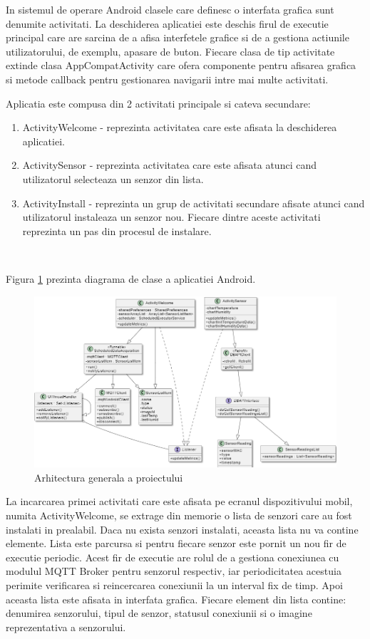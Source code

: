 In sistemul de operare Android clasele care definesc o interfata grafica sunt denumite activitati. La deschiderea aplicatiei este deschis firul de executie principal 
care are sarcina de a afisa interfetele grafice si de a gestiona actiunile utilizatorului, de exemplu, apasare de buton. Fiecare clasa de tip activitate extinde 
clasa AppCompatActivity care ofera componente pentru afisarea grafica si metode callback pentru gestionarea navigarii intre mai multe activitati. 

Aplicatia este compusa din 2 activitati principale si cateva secundare:
\begin{enumerate}
	\item ActivityWelcome - reprezinta activitatea care este afisata la deschiderea aplicatiei.
	\item ActivitySensor - reprezinta activitatea care este afisata atunci cand utilizatorul selecteaza un senzor din lista.
	\item ActivityInstall - reprezinta un grup de activitati secundare afisate atunci cand utilizatorul instaleaza un senzor nou. Fiecare dintre aceste 
	activitati reprezinta un pas din procesul de instalare.
\end{enumerate}

\

Figura \ref{fig:AndroidClassDiagram} prezinta diagrama de clase a aplicatiei Android.
\begin{figure}[H]
    \centering
    \includegraphics[scale=0.64]{figs/AndroidClassDiagram.png}
    \caption{Arhitectura generala a proiectului}
    \label{fig:AndroidClassDiagram}
\end{figure}

La incarcarea primei activitati care este afisata pe ecranul dispozitivului mobil, numita ActivityWelcome, se extrage din memorie o lista de senzori care au fost 
instalati in prealabil. Daca nu exista senzori instalati, aceasta lista nu va contine elemente. Lista este parcursa si pentru fiecare senzor este pornit un nou 
fir de executie periodic. Acest fir de executie are rolul de a gestiona conexiunea cu modulul MQTT Broker pentru senzorul respectiv, iar periodicitatea 
acestuia perimite verificarea si reincercarea conexiunii la un interval fix de timp. Apoi aceasta lista este afisata in interfata grafica. Fiecare element din lista 
contine: denumirea senzorului, tipul de senzor, statusul conexiunii si o imagine reprezentativa a senzorului.

